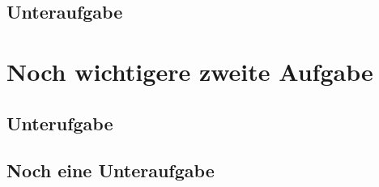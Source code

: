 \subsection{Unteraufgabe}


\section{Noch wichtigere zweite Aufgabe}

\subsection{Unterufgabe}

\subsection{Noch eine Unteraufgabe}

